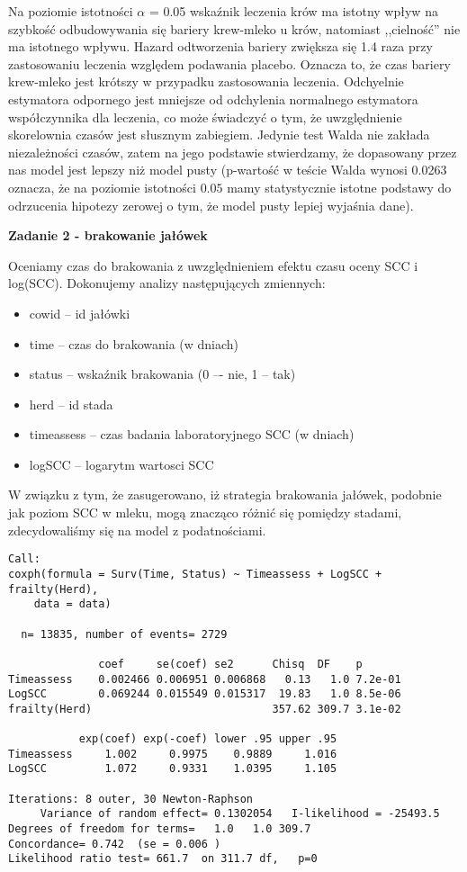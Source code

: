 \documentclass[]{article}
\begin{document}
Na poziomie istotności \(\alpha\) = 0.05 wskaźnik leczenia krów ma
istotny wpływ na szybkość odbudowywania się bariery krew-mleko u krów,
natomiast ,,cielność'' nie ma istotnego wpływu. Hazard odtworzenia
bariery zwiększa się 1.4 raza przy zastosowaniu leczenia względem
podawania placebo. Oznacza to, że czas  bariery
krew-mleko jest krótszy w przypadku zastosowania leczenia. Odchyelnie
estymatora odpornego jest mniejsze od odchylenia normalnego estymatora
współczynnika dla leczenia, co może świadczyć o tym, że uwzględnienie
skorelownia czasów jest słusznym zabiegiem. Jedynie test Walda nie
zakłada niezależności czasów, zatem na jego podstawie stwierdzamy, że
dopasowany przez nas model jest lepszy niż model pusty (p-wartość w
teście Walda wynosi 0.0263 oznacza, że na poziomie istotności \(0.05\)
mamy statystycznie istotne podstawy do odrzucenia hipotezy zerowej o
tym, że model pusty lepiej wyjaśnia dane).

\newpage
\textbf{Zadanie 2 - brakowanie jałówek}

Oceniamy czas do brakowania z uwzględnieniem efektu czasu oceny SCC i
log(SCC). Dokonujemy analizy następujących zmiennych:

\begin{itemize}
\item cowid -- id jałówki
\item time -- czas do brakowania (w dniach)
\item status -- wskaźnik brakowania (0 –- nie, 1 -- tak)
\item herd -- id stada
\item timeassess -- czas badania laboratoryjnego SCC (w dniach)
\item logSCC -- logarytm wartosci SCC
\end{itemize}

W związku z tym, że zasugerowano, iż strategia brakowania jałówek,
podobnie jak poziom SCC w mleku, mogą znacząco różnić się pomiędzy
stadami, zdecydowaliśmy się na model z podatnościami.

\begin{verbatim}
Call:
coxph(formula = Surv(Time, Status) ~ Timeassess + LogSCC + frailty(Herd), 
    data = data)

  n= 13835, number of events= 2729 

              coef     se(coef) se2      Chisq  DF    p      
Timeassess    0.002466 0.006951 0.006868   0.13   1.0 7.2e-01
LogSCC        0.069244 0.015549 0.015317  19.83   1.0 8.5e-06
frailty(Herd)                            357.62 309.7 3.1e-02

           exp(coef) exp(-coef) lower .95 upper .95
Timeassess     1.002     0.9975    0.9889     1.016
LogSCC         1.072     0.9331    1.0395     1.105

Iterations: 8 outer, 30 Newton-Raphson
     Variance of random effect= 0.1302054   I-likelihood = -25493.5 
Degrees of freedom for terms=   1.0   1.0 309.7 
Concordance= 0.742  (se = 0.006 )
Likelihood ratio test= 661.7  on 311.7 df,   p=0
\end{verbatim}
\end{document}
